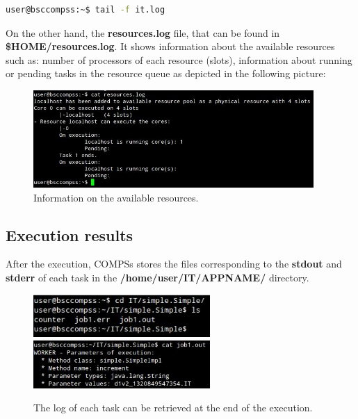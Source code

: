 \begin{lstlisting}[language=bash]
user@bsccompss:~$ tail -f it.log
\end{lstlisting}

On the other hand, the {\bf resources.log} file, that can be found in {\bf \$HOME/resources.log}. It shows information about the available resources such as: number of processors of each resource (slots), information about running or pending tasks in the resource queue as depicted in the following picture:

\begin{figure}[h!]
  \centering
    \includegraphics[width=0.95\textwidth]{./Sections/3_Running_Apps/Figures/available_resources.jpeg}
    \caption{Information on the available resources. \label{fig:available_resources}}
\end{figure}


\subsection{Execution results}
After the execution, COMPSs stores the files corresponding to the {\bf stdout} and {\bf stderr} of each task in the {\bf /home/user/IT/APPNAME/} directory.

\begin{figure}[h!]
  \centering
    \includegraphics[width=0.6\textwidth]{./Sections/3_Running_Apps/Figures/task_log1.jpeg}
    \includegraphics[width=0.6\textwidth]{./Sections/3_Running_Apps/Figures/task_log2.jpeg}
    \caption{The log of each task can be retrieved at the end of the execution. \label{fig:task_logs}}
\end{figure}

